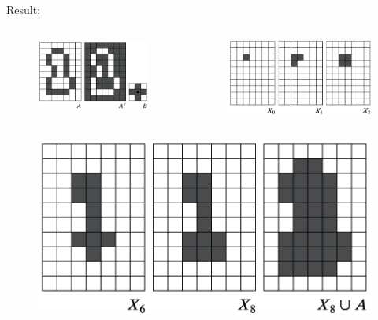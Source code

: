 \begin{frame}
Result:
\begin{columns}
\begin{column}{.45\textwidth}
\begin{figure}[!h]
\includegraphics[width=\textwidth]{fig-9-15abc.png}
\end{figure}
\end{column}
\begin{column}{.55\textwidth}
\begin{figure}[!h]
\includegraphics[width=\textwidth]{fig-9-15def.png}
\end{figure}
\end{column}
\end{columns}
\begin{figure}[!h]
\includegraphics[width=.5\textwidth]{fig-9-15ghi.png}
\end{figure}
\end{frame}

